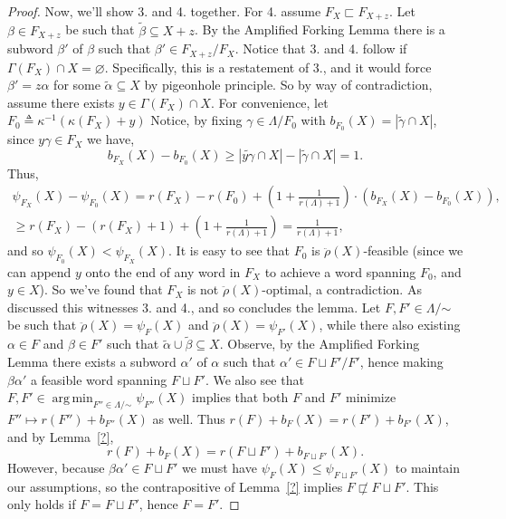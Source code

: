 \documentclass[11pt]{article}
\newcommand{\glang}{\Lambda}
\newcommand{\greedyrep}{\ddot{\rho}}
\DeclareMathOperator*{\argmin}{arg\,min}
\begin{document}
\begin{proof}
    Now, we'll show 3. and 4. together.
    For 4. assume $F_X\sqsubset F_{X+z}$.
    Let $\beta \in F_{X+z}$ be such that $\widetilde{\beta}\subseteq X+z$.
    By the Amplified Forking Lemma there is a subword $\beta'$ of $\beta$ such that $\beta'\in F_{X+z}/F_X$.
    Notice that 3. and 4. follow if $\Gamma(F_X) \cap X = \varnothing$.
    Specifically, this is a restatement of 3., and it would force $\beta' = z\alpha$ for some $\widetilde{\alpha}\subseteq X$ by pigeonhole principle.
    So by way of contradiction, assume there exists $y \in \Gamma(F_X) \cap X$.
    For convenience, let $F_0 \triangleq \kappa^{-1}(\kappa(F_X)+y)$
    Notice, by fixing $\gamma \in \glang/F_0$ with $b_{F_0}(X) = |\widetilde{\gamma}\cap X|$, since $y\gamma \in F_X$ we have,
    \[
        b_{F_X}(X) - b_{F_0}(X) \geq |\widetilde{y\gamma}\cap X| - |\widetilde{\gamma}\cap X| = 1.
    \]
    Thus,
    \begin{multline*}
        \psi_{F_X}(X) - \psi_{F_0}(X) = r(F_X) - r(F_0) + \left(1+\frac{1}{r(\glang)+1}\right)\cdot\left(b_{F_X}(X) - b_{F_0}(X)\right),\\\geq r(F_X) - (r(F_X) + 1) + \left(1+\frac{1}{r(\glang)+1}\right)=\frac{1}{r(\glang)+1},
    \end{multline*}
    and so $\psi_{F_0}(X) < \psi_{F_X}(X)$.
    It is easy to see that $F_0$ is $\greedyrep(X)$-feasible (since we can append $y$ onto the end of any word in $F_X$ to achieve a word spanning $F_0$, and $y\in X$).
    So we've found that $F_X$ is not $\greedyrep(X)$-optimal, a contradiction.
    As discussed this witnesses 3. and 4.,
    and so concludes the lemma.
\iffalse
    Let $F,F'\in\glang/\mathord{\sim}$ be such that $\greedyrep(X) = \psi_F(X)$ and $\greedyrep(X) = \psi_{F'}(X)$, while there also existing $\alpha \in F$ and $\beta \in F'$ such that $\widetilde{\alpha}\cup\widetilde{\beta}\subseteq X$.
Observe, by the Amplified Forking Lemma there exists a subword $\alpha'$ of $\alpha$ such that $\alpha'\in F\sqcup F'/F'$, hence making $\beta\alpha'$ a feasible word spanning $F\sqcup F'$.
    We also see that $F,F'\in\argmin_{F''\in\glang/\mathord{\sim}}\psi_{F''}(X)$ implies that both $F$ and $F'$ minimize $F''\mapsto r(F'') + b_{F''}(X)$ as well.
    Thus $r(F) + b_{F}(X) = r(F') + b_{F'}(X)$, and by Lemma~\ref{?},
    \[
        r(F) + b_F(X) = r(F\sqcup F') + b_{F\sqcup F'}(X).
    \]
    However, because $\beta\alpha' \in F\sqcup F'$ we must have $\psi_{F}(X) \leq \psi_{F\sqcup F'}(X)$ to maintain our assumptions, so the contrapositive of Lemma~\ref{?} implies $F\not\sqsubset F\sqcup F'$.
    This only holds if $F = F\sqcup F'$, hence $F = F'$.


\end{proof}
\end{document}
